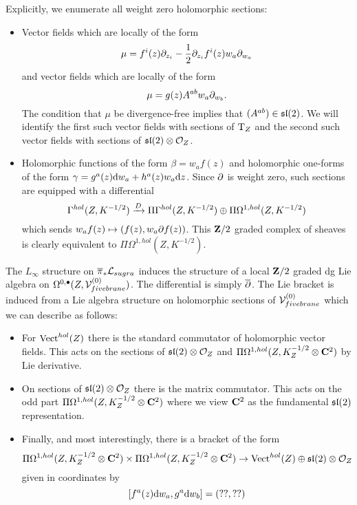 \documentclass[11pt]{amsart}
\begin{document}
Explicitly, we enumerate all weight zero holomorphic sections:
\begin{itemize}
\item Vector fields which are locally of the form 
\[
\mu = f^i(z) \partial_{z_i} - \frac12 \partial_{z_i} f^i(z) w_a \partial_{w_a}
\]
and vector fields which are locally of the form
\[
\mu = g(z) A^{ab} w_a \partial_{w_b}.
\]
The condition that $\mu$ be divergence-free implies that $(A^{ab}) \in \mathfrak{sl}(2)$.
We will identify the first such vector fields with sections of ${\rm T}_Z$ and the second such vector fields with sections of $\mathfrak{sl}(2) \otimes \mathcal O_Z$. 
\item Holomorphic functions of the form $\beta = w_a f(z)$ and holomorphic one-forms of the form $\gamma = g^{a}(z) {\rm d} w_a + h^{a} (z) w_a {\rm d} z$. 
Since $\partial$ is weight zero, such sections are equipped with a differential 
\[
\Gamma^{hol}(Z, K^{-1/2}) \xrightarrow{D} \Pi \Gamma^{hol}(Z, K^{-1/2}) \oplus \Pi\Omega^{1,hol}(Z, K^{-1/2}) 
\]
which sends $w_a f(z) \mapsto (f(z) , w_a \partial f (z))$. 
This $\mathbf{Z}/2$ graded complex of sheaves is clearly equivalent to $\Pi\Omega^{1,hol}(Z, K^{-1/2})$. 
\end{itemize}

The $L_\infty$ structure on $\overline{\pi}_* \mathcal L_{sugra}$ induces the structure of a local $\mathbf{Z}/2$ graded dg Lie algebra on $\Omega^{0,\bullet}(Z, \mathcal V_{fivebrane}^{(0)})$. 
The differential is simply $\overline{\partial}$. 
The Lie bracket is induced from a Lie algebra structure on holomorphic sections of $\mathcal V_{fivebrane}^{(0)}$ which we can describe as follows:
\begin{itemize}
\item For $\operatorname{Vect}^{hol}(Z)$ there is the standard commutator of holomorphic vector fields. 
This acts on the sections of $\mathfrak{sl}(2) \otimes \mathcal O_Z$ and $\Pi\Omega^{1,hol}(Z, K^{-1/2}_Z \otimes \mathbf{C}^2)$ by Lie derivative. 
\item On sections of $\mathfrak{sl}(2) \otimes \mathcal O_Z$ there is the matrix commutator. 
This acts on the odd part $\Pi\Omega^{1,hol}(Z, K^{-1/2}_Z \otimes \mathbf{C}^2)$ where we view $\mathbf{C}^2$ as the fundamental $\mathfrak{sl}(2)$ representation. 
\item Finally, and most interestingly, there is a bracket of the form
\[
\Pi\Omega^{1,hol}(Z, K^{-1/2}_Z \otimes \mathbf{C}^2) \times \Pi\Omega^{1,hol}(Z, K^{-1/2}_Z \otimes \mathbf{C}^2) \to \operatorname{Vect}^{hol}(Z) \oplus \mathfrak{sl}(2) \otimes \mathcal O_Z 
\]
given in coordinates by
\[
[f^a(z) {\rm d} w_a , g^a {\rm d} w_b] = \left(??, ??\right) 
\]
\end{itemize}
\end{document}
